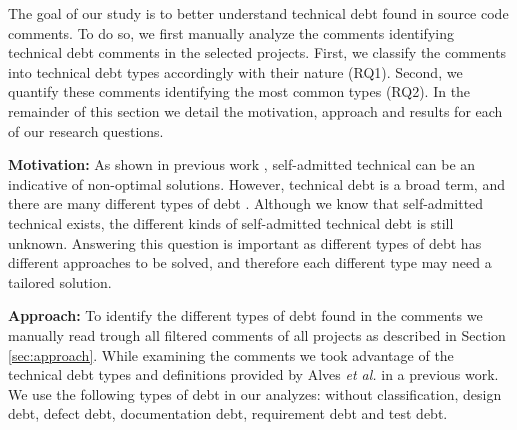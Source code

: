 The goal of our study is to better understand technical debt found in source code comments. To do so, we first manually analyze the comments identifying technical debt comments in the selected projects. First, we classify the comments into technical debt types accordingly with their nature (RQ1). Second, we quantify these comments identifying the most common types (RQ2). In the remainder of this section we detail the motivation, approach and results for each of our research questions.  

\vspace{3mm}
\noindent\rqi
\vspace{3mm}


\noindent\textbf{Motivation:} As shown in previous work \cite{Potdar2014ICSME}, self-admitted technical can be an indicative of non-optimal solutions. However, technical debt is a broad term, and there are many different types of debt \cite{Alves2014MTD}. Although we know that self-admitted technical exists, the different kinds of self-admitted technical debt is still  unknown. Answering this question is important as different types of debt has different approaches to be solved, and therefore each different type may need a tailored solution.


\vspace{1mm}
\noindent\textbf{Approach:} To identify the different types of debt found in the comments we manually read trough all filtered comments of all projects as described in Section \ref{sec:approach}. While examining the comments we took advantage of the technical debt types and definitions provided by Alves \textit{et al.} in a previous work. We use the following types of debt in our analyzes: without classification, design debt, defect debt, documentation debt, requirement debt and  test debt.

